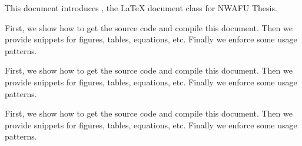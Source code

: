 This document introduces \nwafuthesis, the \LaTeX{} document class for NWAFU Thesis.

First, we show how to get the source code and compile this document.
Then we provide snippets for figures, tables, equations, etc.
Finally we enforce some usage patterns.

First, we show how to get the source code and compile this document.
Then we provide snippets for figures, tables, equations, etc.
Finally we enforce some usage patterns.

First, we show how to get the source code and compile this document.
Then we provide snippets for figures, tables, equations, etc.
Finally we enforce some usage patterns.
